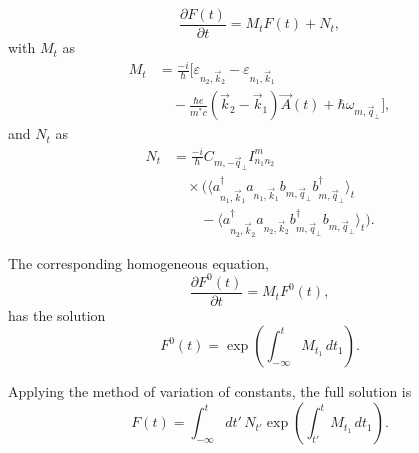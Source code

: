 \documentclass[%
 reprint,
 amsmath,amssymb,
 aps,
]{revtex4-2}
\begin{document}
\begin{equation}
\frac{\partial F(t)}{\partial t}
=
M_t F(t)
+
N_t,
\end{equation}
with $M_{t}$ as
\begin{equation}
    \begin{split}
        M_t &=
\frac{-i}{\hbar}
\Big[
\varepsilon_{n_2,\vec{k}_2}
-
\varepsilon_{n_1,\vec{k}_1}
\\
& \quad -
\frac{\hbar e}{m^* c}
(\vec{k}_2-\vec{k}_1)
\vec{A}(t)
+
\hbar \omega_{m,\vec{q}_{\perp}}
\Big],
    \end{split}
\end{equation}
and $N_{t}$ as
\begin{equation}
\begin{split}
N_t
&=
\frac{-i}{\hbar}
C_{m,-\vec{q}_{\perp}}
I_{n_1 n_2}^{m}
\\
&\quad\times
\Big(
\langle
a_{n_1,\vec{k}_1}^{\dagger}
a_{n_1,\vec{k}_1}
b_{m,\vec{q}_{\perp}}
b_{m,\vec{q}_{\perp}}^{\dagger}
\rangle_t
\\
&\qquad
-
\langle
a_{n_2,\vec{k}_2}^{\dagger}
a_{n_2,\vec{k}_2}
b_{m,\vec{q}_{\perp}}^{\dagger}
b_{m,\vec{q}_{\perp}}
\rangle_t
\Big).
\end{split}
\end{equation}

The corresponding homogeneous equation,
\begin{equation}
\frac{\partial F^0(t)}{\partial t}
=
M_t F^0(t),
\end{equation}
has the solution
\begin{equation}
F^0(t)
=
\exp\left(
\int_{-\infty}^{t}
M_{t_1}
\, dt_1
\right).
\end{equation}

Applying the method of variation of constants, the full solution is
\begin{equation}
F(t)
=
\int_{-\infty}^{t}
dt'\,
N_{t'}
\exp\left(
\int_{t'}^{t}
M_{t_1}
\, dt_1
\right).
\end{equation}
\end{document}
